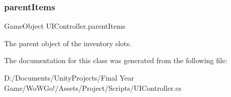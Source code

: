 \subsubsection{\texorpdfstring{parentItems}{parentItems}}
{\footnotesize\ttfamily Game\+Object U\+I\+Controller.\+parent\+Items}



The parent object of the inventory slots. 



The documentation for this class was generated from the following file\+:\begin{DoxyCompactItemize}
\item 
D\+:/\+Documents/\+Unity\+Projects/\+Final Year Game/\+Wo\+W\+Go!/\+Assets/\+Project/\+Scripts/U\+I\+Controller.\+cs\end{DoxyCompactItemize}

